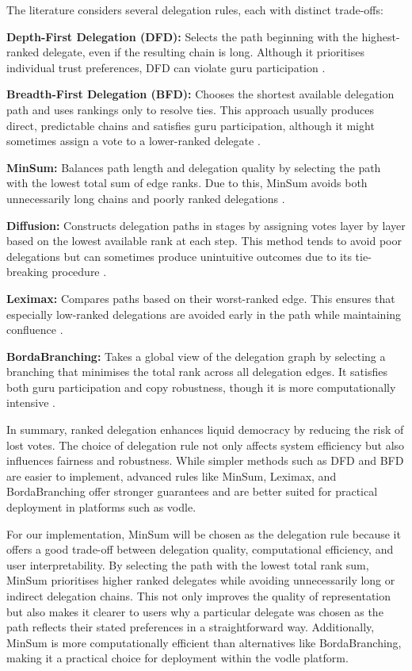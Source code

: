 The literature considers several delegation rules, each with distinct trade-offs:

\textbf{Depth-First Delegation (DFD):} Selects the path beginning with the highest-ranked delegate, even if the resulting chain is long. Although it prioritises individual trust preferences, DFD can violate guru participation \citep{kotsialou_riley_2020}.

\textbf{Breadth-First Delegation (BFD):} Chooses the shortest available delegation path and uses rankings only to resolve ties. This approach usually produces direct, predictable chains and satisfies guru participation, although it might sometimes assign a vote to a lower-ranked delegate \citep{kotsialou_riley_2020, brill_liquid_2022}.

\textbf{MinSum:} Balances path length and delegation quality by selecting the path with the lowest total sum of edge ranks. Due to this, MinSum avoids both unnecessarily long chains and poorly ranked delegations \citep{brill_liquid_2022}.

\textbf{Diffusion:} Constructs delegation paths in stages by assigning votes layer by layer based on the lowest available rank at each step. This method tends to avoid poor delegations but can sometimes produce unintuitive outcomes due to its tie-breaking procedure \citep{brill_liquid_2022}.

\textbf{Leximax:} Compares paths based on their worst-ranked edge. This ensures that especially low-ranked delegations are avoided early in the path while maintaining confluence \citep{brill_liquid_2022}.

\textbf{BordaBranching:} Takes a global view of the delegation graph by selecting a branching that minimises the total rank across all delegation edges. It satisfies both guru participation and copy robustness, though it is more computationally intensive \citep{brill_liquid_2022}.

In summary, ranked delegation enhances liquid democracy by reducing the risk of lost votes. The choice of delegation rule not only affects system efficiency but also influences fairness and robustness. While simpler methods such as DFD and BFD are easier to implement, advanced rules like MinSum, Leximax, and BordaBranching offer stronger guarantees and are better suited for practical deployment in platforms such as vodle.

For our implementation, MinSum will be chosen as the delegation rule because it offers a good trade-off between delegation quality, computational efficiency, and user interpretability. By selecting the path with the lowest total rank sum, MinSum prioritises higher ranked delegates while avoiding unnecessarily long or indirect delegation chains. This not only improves the quality of representation but also makes it clearer to users why a particular delegate was chosen as the path reflects their stated preferences in a straightforward way. Additionally, MinSum is more computationally efficient than alternatives like BordaBranching, making it a practical choice for deployment within the vodle platform.

